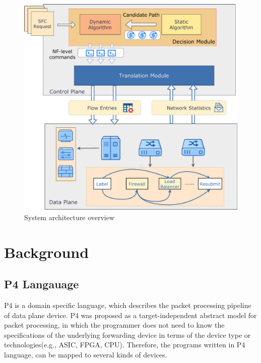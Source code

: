 \documentclass[10pt, conference, letterpaper]{IEEEtran}
\begin{document}
%
%
%



\begin{figure}[t]
\centerline{\includegraphics[width=0.85\linewidth]{src/arch.pdf}}
\caption{System architecture overview}
\label{architecture}
\end{figure}
 
\section{Background}

\subsection{P4 Langauage}
P4\cite{bosshart2014p4} is a domain specific language, which describes the packet processing pipeline of data plane device.  P4 was proposed as a target-independent abstract model for packet processing, in which the programmer does not need to know the specifications of the underlying forwarding device in terms of the device type or technologies(e.g., ASIC, FPGA, CPU). Therefore, the programs written in P4 language, can be mapped to several kinds of devices. 
\end{document}

